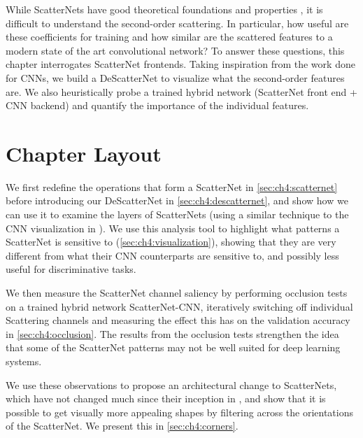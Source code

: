 While ScatterNets have good theoretical foundations and properties
\cite{mallat_group_2012}, it is difficult to understand the second-order
scattering. In particular, how useful are these coefficients for
training and how similar are the scattered features to a modern state of the art
convolutional network? To answer these questions, this chapter interrogates
ScatterNet frontends. Taking inspiration from the work done for
CNNs, we build a DeScatterNet to visualize what the second-order features are.
We also heuristically probe a trained hybrid network (ScatterNet front end + CNN
backend) and quantify the importance of the individual features.

\section{Chapter Layout}
We first redefine the operations that form a ScatterNet in
\autoref{sec:ch4:scatternet} before introducing our DeScatterNet in
\autoref{sec:ch4:descatternet}, and show how we can use it to examine the
layers of ScatterNets (using a similar technique to the CNN visualization in
\cite{zeiler_visualizing_2014}). We use this analysis tool to highlight what
patterns a ScatterNet is sensitive to (\autoref{sec:ch4:visualization}), showing
that they are very different from what their CNN counterparts are sensitive to,
and possibly less useful for discriminative tasks.

We then measure the ScatterNet channel saliency by performing occlusion tests
on a trained hybrid network ScatterNet-CNN, iteratively switching off individual
Scattering channels and measuring the effect this has on the validation accuracy
in \autoref{sec:ch4:occlusion}. The results from the occlusion tests strengthen
the idea that some of the ScatterNet patterns may not be well suited for deep
learning systems.

We use these observations to propose an architectural change to ScatterNets,
which have not changed much since their inception in \cite{mallat_group_2012},
and show that it is possible to get visually more appealing shapes by filtering
across the orientations of the ScatterNet. We present this in
\autoref{sec:ch4:corners}.

